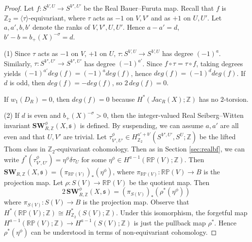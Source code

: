 \documentclass{amsart}
\theoremstyle{definition}
\theoremstyle{remark}
\numberwithin{equation}{section}
\begin{document}
\begin{proof}
Let $f : S^{V,U} \to S^{V',U'}$ be the Real Bauer--Furuta map. Recall that $f$ is $\mathbb{Z}_2 = \langle \tau \rangle$-equivariant, where $\tau$ acts as $-1$ on $V,V'$ and as $+1$ on $U,U'$. Let $a,a',b,b'$ denote the ranks of $V,V',U,U'$. Hence $a-a' = d$, $b'-b = b_+(X)^{-\sigma} = d$.

(1) Since $\tau$ acts as $-1$ on $V$, $+1$ on $U$, $\tau : S^{V,U} \to S^{V,U}$ has degree $(-1)^a$. Similarly, $\tau : S^{V',U'} \to S^{V',U'}$ has degree $(-1)^{a'}$. Since $f \circ \tau = \tau \circ f$, taking degrees yields $(-1)^{a'} deg(f) = (-1)^{a} deg(f)$, hence $deg(f) = (-1)^d deg(f)$. If $d$ is odd, then $deg(f) = -deg(f)$, so $2\, deg(f) = 0$. 



If $w_1(D_R) = 0$, then $deg(f) = 0$ because $H^*(Jac_R(X) ; \mathbb{Z})$ has no $2$-torsion.

(2) If $d$ is even and $b_+(X)^{-\sigma} > 0$, then the integer-valued Real Seiberg--Witten invariant $\mathbf{SW}^\phi_{R,\mathbb{Z}}(X,\mathfrak{s})$ is defined. By suspending, we can assume $a,a'$ are all even and that $U,V'$ are trivial. Let $\tau^\phi_{V',U'} \in H^{a'+b'}_{\mathbb{Z}_2}( S^{V',U'} , S^U ; \mathbb{Z})$ be the lifted Thom class in $\mathbb{Z}_2$-equivariant cohomology. Then as in Section \ref{sec:realbf}, we can write $f^*( \tau^\phi_{V',U'} ) = \eta^\phi \delta \tau_U$ for some $\eta^\phi \in H^{a-1}(\mathbb{RP}(V) ; \mathbb{Z})$. Then $\mathbf{SW}_{R,\mathbb{Z}}(X,\mathfrak{s}) = (\pi_{\mathbb{RP}(V)})_*( \eta^\phi )$, where $\pi_{\mathbb{RP}(V)} : \mathbb{RP}(V) \to B$ is the projection map. Let $\rho : S(V) \to \mathbb{RP}(V)$ be the quotient map. Then
\begin{equation}\label{equ:2SW}
2 \, \mathbf{SW}^\phi_{R,\mathbb{Z}}(X,\mathfrak{s}) = (\pi_{S(V)})_*( \rho^*(\eta^\phi) )
\end{equation}
where $\pi_{S(V)} : S(V) \to B$ is the projection map. Observe that $H^*(\mathbb{RP}(V) ; \mathbb{Z}) \cong H^*_{\mathbb{Z}_2}( S(V) ; \mathbb{Z})$. Under this isomorphism, the forgetful map $H^{a-1}(\mathbb{RP}(V) ; \mathbb{Z}) \to H^{a-1}(S(V) ; \mathbb{Z})$ is just the pullback map $\rho^*$. Hence $\rho^*(\eta^\phi)$ can be understood in terms of non-equivariant cohomology.


\end{proof}
\end{document}
